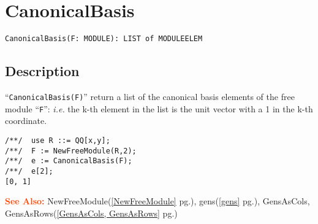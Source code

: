 \documentclass[a4paper]{mybook}
\newenvironment{command}{}{} %
\newcommand\SeeAlso{\par\textcolor{OrangeRed}{\textbf{\large See Also: }}}
\begin{document}
\section{CanonicalBasis}
\label{CanonicalBasis}
\begin{command} %


\begin{Verbatim}[label=syntax, rulecolor=\color{MidnightBlue},
frame=single]
CanonicalBasis(F: MODULE): LIST of MODULEELEM
\end{Verbatim}


\subsection*{Description}

``\verb&CanonicalBasis(F)&'' return a list of the canonical basis elements
of the free module ``\verb&F&'': \textit{i.e.} the k-th element in the list is the
unit vector with a 1 in the k-th coordinate.
\begin{Verbatim}[label=example, rulecolor=\color{PineGreen}, frame=single]
/**/  use R ::= QQ[x,y];
/**/  F := NewFreeModule(R,2);
/**/  e := CanonicalBasis(F);
/**/  e[2];
[0, 1]
\end{Verbatim}


\SeeAlso %
  NewFreeModule(\ref{NewFreeModule} pg.\pageref{NewFreeModule}), 
    gens(\ref{gens} pg.\pageref{gens}), 
    GensAsCols, GensAsRows(\ref{GensAsCols, GensAsRows} pg.\pageref{GensAsCols, GensAsRows})
\end{command} %
\end{document}
